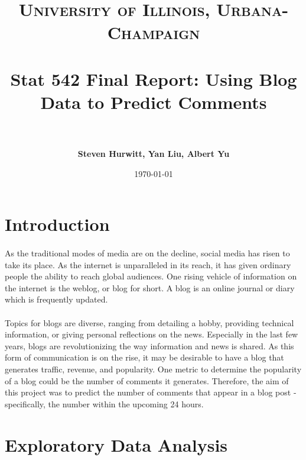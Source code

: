 \documentclass[paper=a4, fontsize=11pt]{scrartcl} %
\title{	
\normalfont \normalsize 
\textsc{University of Illinois, Urbana-Champaign} \\ [25pt] %
\horrule{0.5pt} \\[0.4cm] %
\huge Stat 542 Final Report: Using Blog Data to Predict Comments \\ %
\horrule{2pt} \\[0.5cm] %
}
\author{\textbf{Steven Hurwitt, Yan Liu, Albert Yu}} %
\date{\normalsize\today} %
\numberwithin{equation}{section} %
\numberwithin{figure}{section} %
\numberwithin{table}{section} %
\begin{document}
\maketitle %

\graphicspath{{ /Users/stevenhurwitt/Documents/Illinois/Stat542/FINAL/Pictures }} %


\section{Introduction}

\paragraph{}
As the traditional modes of media are on the decline, social media has risen to take its place. As the internet is unparalleled in its reach, it has given ordinary people the ability to reach global audiences. One rising vehicle of information on the internet is the weblog, or blog for short. A blog is an online journal or diary which is frequently updated.

\paragraph{}
Topics for blogs are diverse, ranging from detailing a hobby, providing technical information, or giving personal reflections on the news. Especially in the last few years, blogs are revolutionizing the way information and news is shared. As this form of communication is on the rise, it may be desirable to have a blog that generates traffic, revenue, and popularity. One metric to determine the popularity of a blog could be the number of comments it generates. Therefore, the aim of this project was to predict the number of comments that appear in a blog post - specifically, the number within the upcoming 24 hours.



\section{Exploratory Data Analysis}
\end{document}
